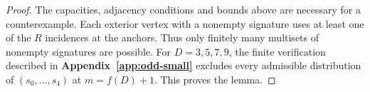 \begin{proof}
The capacities, adjacency conditions and bounds above are necessary
for a counterexample. Each exterior vertex with a nonempty signature
uses at least one of the $R$ incidences at the anchors. Thus only
finitely many multisets of nonempty signatures are possible. For
$D=3,5,7,9$, the finite verification described
in \textbf{Appendix~\ref{app:odd-small}} excludes every admissible distribution
of $(s_0,\ldots,s_4)$ at $m=f(D)+1$. This proves the lemma.
\end{proof}
